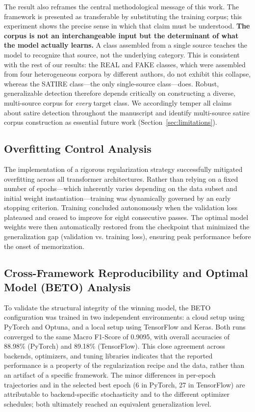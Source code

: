 \documentclass[informatics,article,submit,pdftex,moreauthors]{Definitions/mdpi}
\begin{document}
The result also reframes the central methodological message of this work. The framework is presented as transferable by substituting the training corpus; this experiment shows the precise sense in which that claim must be understood. \textbf{The corpus is not an interchangeable input but the determinant of what the model actually learns.} A class assembled from a single source teaches the model to recognize that source, not the underlying category. This is consistent with the rest of our results: the REAL and FAKE classes, which were assembled from four heterogeneous corpora by different authors, do not exhibit this collapse, whereas the SATIRE class—the only single-source class—does. Robust, generalizable detection therefore depends critically on constructing a diverse, multi-source corpus for \emph{every} target class. We accordingly temper all claims about satire detection throughout the manuscript and identify multi-source satire corpus construction as essential future work (Section~\ref{sec:limitations}).

\subsection{Overfitting Control Analysis}
The implementation of a rigorous regularization strategy successfully mitigated overfitting across all transformer architectures. Rather than relying on a fixed number of epochs—which inherently varies depending on the data subset and initial weight instantiation—training was dynamically governed by an early stopping criterion. Training concluded autonomously when the validation loss plateaued and ceased to improve for eight consecutive passes. The optimal model weights were then automatically restored from the checkpoint that minimized the generalization gap (validation vs. training loss), ensuring peak performance before the onset of memorization. 

\subsection{Cross-Framework Reproducibility and Optimal Model (BETO) Analysis}
To validate the structural integrity of the winning model, the BETO configuration was trained in two independent environments: a cloud setup using PyTorch and Optuna, and a local setup using TensorFlow and Keras. Both runs converged to the same Macro F1-Score of 0.9095, with overall accuracies of 88.98\% (PyTorch) and 89.18\% (TensorFlow). This close agreement across backends, optimizers, and tuning libraries indicates that the reported performance is a property of the regularization recipe and the data, rather than an artifact of a specific framework. The minor differences in per-epoch trajectories and in the selected best epoch (6 in PyTorch, 27 in TensorFlow) are attributable to backend-specific stochasticity and to the different optimizer schedules; both ultimately reached an equivalent generalization level.
\end{document}
